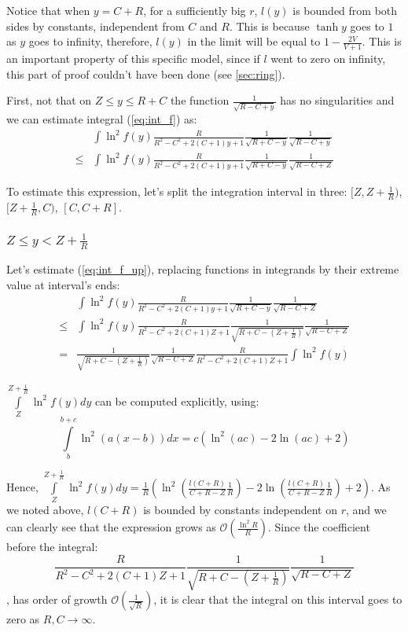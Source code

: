 \documentclass[12pt, a4paper]{article}
\newcommand{\mtodo}[1]{\todo[linecolor=green!70!white, backgroundcolor=blue!20!white, bordercolor=red]{#1}}
\theoremstyle{plain}
\newcommand{\mcO}{\mathcal{O}} %
\begin{document}
Notice that when $y = C + R$, for a sufficiently big $r$, $l(y)$ is bounded from both sides by constants, independent from $C$ and $R$. This is because $\tanh y$ goes to $1$ as $y$ goes to infinity, therefore, $l(y)$ in the limit will be equal to $1 - \frac{2 V}{V + 1}$. This is an important property of this specific model, since if $l$ went to zero on infinity, this part of proof couldn't have been done (see \autoref{sec:ring}).

First, not that on $Z \le y \le R + C$ the function $\frac{1}{\sqrt{R - C + y}}$ has no singularities and we can estimate integral (\ref{eq:int_f}) as:
\begin{equation}\label{eq:int_f_up}
\begin{aligned}
       & \int \ln^2 f(y) \frac{R}{R^2 - C^2 + 2 (C + 1) y + 1} \frac{1}{\sqrt{R + C - y}} \frac{1}{\sqrt{R - C + y}}
\\ \le & \int \ln^2 f(y) \frac{R}{R^2 - C^2 + 2 (C + 1) y + 1} \frac{1}{\sqrt{R + C - y}} \frac{1}{\sqrt{R - C + Z}} 
\end{aligned}
\end{equation}

To estimate this expression, let's split the integration interval in three: $[Z, Z + \frac{1}{R})$, $[Z + \frac{1}{R}, C)$, $[C, C + R]$.

\subsubsection{$Z \le y < Z + \frac{1}{R}$}

Let's estimate (\ref{eq:int_f_up}), replacing functions in integrands by their extreme value at interval's ends:
\begin{align*}
       & \int \ln^2 f(y) \frac{R}{R^2 - C^2 + 2 (C + 1) y + 1} \frac{1}{\sqrt{R + C - y}} \frac{1}{\sqrt{R - C + Z}}
\\ \le & \int \ln^2 f(y) \frac{R}{R^2 - C^2 + 2 (C + 1) Z + 1} \frac{1}{\sqrt{R + C - (Z + \frac{1}{R})}} \frac{1}{\sqrt{R - C + Z}}
\\ =   & \frac{1}{\sqrt{R + C - (Z + \frac{1}{R})}} \frac{1}{\sqrt{R - C + Z}} \frac{R}{R^2 - C^2 + 2 (C + 1) Z + 1} \int \ln^2 f(y) 
\end{align*}

\mtodo{reference?}
$\int\limits_{Z}^{Z + \frac{1}{R}} \ln^2 f(y) dy$ can be computed explicitly, using:
\[
    \int\limits_b^{b + c} \ln^2 (a (x - b)) dx = c (\ln^2(a c) - 2 \ln (a c) + 2)
\]

Hence, $\int\limits_{Z}^{Z + \frac{1}{R}} \ln^2 f(y) dy = \frac{1}{R} ( \ln^2 (\frac{l(C + R)}{C + R - Z} \frac{1}{R}) - 2 \ln (\frac{l(C + R)}{C + R - Z} \frac{1}{R}) + 2)$. As we noted above, $l(C + R)$ is bounded by constants independent on $r$, and we can clearly see that the expression grows as $\mcO(\frac{\ln^2 R}{R})$. Since the coefficient before the integral:
\[
\frac{R}{R^2 - C^2 + 2 (C + 1) Z + 1} \frac{1}{\sqrt{R + C - (Z + \frac{1}{R})}} \frac{1}{\sqrt{R - C + Z}}
\]
, has order of growth $\mcO\left(\frac{1}{\sqrt{R}}\right)$, it is clear that the integral on this interval goes to zero as $R, C \to \infty$.
\end{document}
